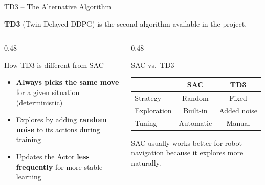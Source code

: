 \documentclass[aspectratio=169, 11pt]{beamer}
\begin{document}
\begin{frame}{TD3 -- The Alternative Algorithm}

  \textbf{TD3} (Twin Delayed DDPG) is the second algorithm available
  in the project.

  \vspace{0.4em}

  \begin{columns}[T]
    \begin{column}{0.48\textwidth}
      \begin{block}{How TD3 is different from SAC}
        \begin{itemize}\small
          \item \textbf{Always picks the same move} for a given
                situation (deterministic)
          \item Explores by adding \textbf{random noise}
                to its actions during training
          \item Updates the Actor \textbf{less frequently}
                for more stable learning
        \end{itemize}
      \end{block}
    \end{column}

    \begin{column}{0.48\textwidth}
      \begin{alertblock}{SAC vs.\ TD3}
        \renewcommand{\arraystretch}{1.3}
        \small
        \begin{tabular}{lcc}
          & \textbf{SAC} & \textbf{TD3}\\
          \midrule
          Strategy & Random & Fixed\\
          Exploration & Built-in & Added noise\\
          Tuning & Automatic & Manual\\
        \end{tabular}
      \end{alertblock}

      \vspace{0.3em}
      {\small\color{upecgray}
        SAC usually works better for robot navigation
        because it explores more naturally.}
    \end{column}
  \end{columns}
\end{frame}

\end{document}

